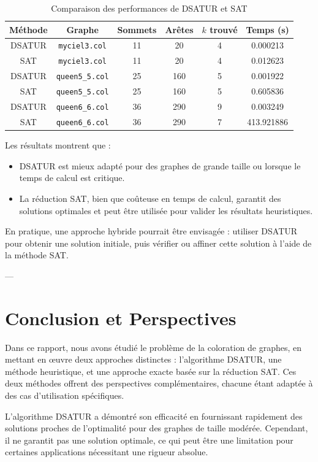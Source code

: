 \documentclass[11pt]{article}
\begin{document}
\begin{table}[h!]
\centering
\begin{tabular}{|c|c|c|c|c|c|}
\hline
\textbf{Méthode} & \textbf{Graphe} & \textbf{Sommets} & \textbf{Arêtes} & \textbf{\(k\) trouvé} & \textbf{Temps (s)} \\ \hline
DSATUR & \texttt{myciel3.col} & 11 & 20 & 4 & 0.000213 \\
SAT & \texttt{myciel3.col} & 11 & 20 & 4 & 0.012623 \\ \hline
DSATUR & \texttt{queen5\_5.col} & 25 & 160 & 5 & 0.001922 \\
SAT & \texttt{queen5\_5.col} & 25 & 160 & 5 & 0.605836 \\ \hline
DSATUR & \texttt{queen6\_6.col} & 36 & 290 & 9 & 0.003249 \\
SAT & \texttt{queen6\_6.col} & 36 & 290 & 7 & 413.921886 \\ \hline
\end{tabular}
\caption{Comparaison des performances de DSATUR et SAT}
\label{tab:comparaison}
\end{table}

Les résultats montrent que :
\begin{itemize}
    \item DSATUR est mieux adapté pour des graphes de grande taille ou lorsque le temps de calcul est critique.
    \item La réduction SAT, bien que coûteuse en temps de calcul, garantit des solutions optimales et peut être utilisée pour valider les résultats heuristiques.
\end{itemize}

En pratique, une approche hybride pourrait être envisagée : utiliser DSATUR pour obtenir une solution initiale, puis vérifier ou affiner cette solution à l'aide de la méthode SAT.

---

\section{Conclusion et Perspectives}

Dans ce rapport, nous avons étudié le problème de la coloration de graphes, en mettant en œuvre deux approches distinctes : l'algorithme DSATUR, une méthode heuristique, et une approche exacte basée sur la réduction SAT. Ces deux méthodes offrent des perspectives complémentaires, chacune étant adaptée à des cas d'utilisation spécifiques.

L'algorithme DSATUR a démontré son efficacité en fournissant rapidement des solutions proches de l'optimalité pour des graphes de taille modérée. Cependant, il ne garantit pas une solution optimale, ce qui peut être une limitation pour certaines applications nécessitant une rigueur absolue.
\end{document}
